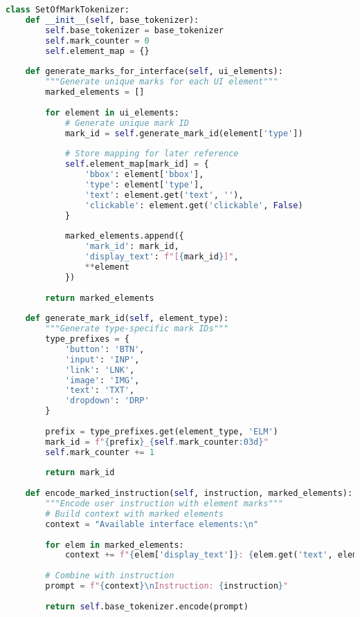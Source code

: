 \begin{lstlisting}[language=Python, caption=Set-of-Mark implementation for GUI understanding]
class SetOfMarkTokenizer:
    def __init__(self, base_tokenizer):
        self.base_tokenizer = base_tokenizer
        self.mark_counter = 0
        self.element_map = {}
        
    def generate_marks_for_interface(self, ui_elements):
        """Generate unique marks for each UI element"""
        marked_elements = []
        
        for element in ui_elements:
            # Generate unique mark ID
            mark_id = self.generate_mark_id(element['type'])
            
            # Store mapping for later reference
            self.element_map[mark_id] = {
                'bbox': element['bbox'],
                'type': element['type'],
                'text': element.get('text', ''),
                'clickable': element.get('clickable', False)
            }
            
            marked_elements.append({
                'mark_id': mark_id,
                'display_text': f"[{mark_id}]",
                **element
            })
            
        return marked_elements
    
    def generate_mark_id(self, element_type):
        """Generate type-specific mark IDs"""
        type_prefixes = {
            'button': 'BTN',
            'input': 'INP',
            'link': 'LNK',
            'image': 'IMG',
            'text': 'TXT',
            'dropdown': 'DRP'
        }
        
        prefix = type_prefixes.get(element_type, 'ELM')
        mark_id = f"{prefix}_{self.mark_counter:03d}"
        self.mark_counter += 1
        
        return mark_id
    
    def encode_marked_instruction(self, instruction, marked_elements):
        """Encode user instruction with element marks"""
        # Build context with marked elements
        context = "Available interface elements:\n"
        
        for elem in marked_elements:
            context += f"{elem['display_text']}: {elem.get('text', elem['type'])}\n"
        
        # Combine with instruction
        prompt = f"{context}\nInstruction: {instruction}"
        
        return self.base_tokenizer.encode(prompt)
    

\end{lstlisting}
